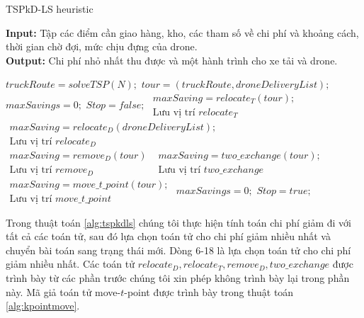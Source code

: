 \documentclass[a4paper,12pt]{report}
\begin{document}
\begin{algorithm}[H]
\caption{TSPkD-LS heuristic}
\textbf{Input:} Tập các điểm cần giao hàng, kho, các tham số về chi phí và khoảng cách, thời gian chờ đợi, mức chịu đựng của drone.\\
\textbf{Output:} Chi phí nhỏ nhất thu được và một hành trình cho xe tải và drone.
\begin{algorithmic}[1]
\State $truckRoute = solveTSP(N);$
\State $tour = (truckRoute, droneDeliveryList);$
\State $maxSavings = 0;$
\State $Stop = false;$
\Repeat
{}
\State $\begin{array}{l}
maxSaving=relocate_T(tour); \\
\text{Lưu vị trí } relocate_T
\end{array}$
\State $\begin{array}{l}
maxSaving=relocate_D(droneDeliveryList); \\
\text{Lưu vị trí } relocate_D
\end{array}$
\State $\begin{array}{l}
maxSaving=remove_D(tour) \\
\text{Lưu vị trí } remove_D
\end{array}$
\State $\begin{array}{l}
maxSaving=two\_exchange(tour); \\
\text{Lưu vị trí } two\_exchange
\end{array}$
\State $\begin{array}{l}
maxSaving=move\_t\_point(tour); \\
\text{Lưu vị trí } move\_t\_point
\end{array}$
\EndIf
{} 
\State $maxSavings=0;$
\Else 
\State $Stop=true;$
\EndIf

\end{algorithmic}
\label{alg:tspkdls}
\end{algorithm}
Trong thuật toán \ref{alg:tspkdls} chúng tôi thực hiện tính toán chi phí giảm đi với tất cả các toán tử, sau đó lựa chọn toán tử cho chi phí giảm nhiều nhất và chuyển bài toán sang trạng thái mới. Dòng 6-18 là lựa chọn toán tử cho chi phí giảm nhiều nhất. Các toán tử $relocate_D, relocate_T, remove_D, two\_exchange$ được trình bày từ các phần trước chúng tôi xin phép không trình bày lại trong phần này. Mã giả toán tử move-$t$-point được trình bày trong thuật toán \ref{alg:kpointmove}.
\end{document}
